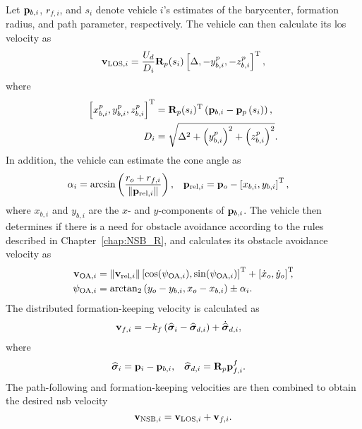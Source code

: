 Let $\mathbf{p}_{b, i}$, $r_{f, i}$, and $s_i$ denote vehicle $i$'s estimates of the barycenter, formation radius, and path parameter, respectively.
The vehicle can then calculate its \gls{los} velocity as
\begin{equation}
    \mathbf{v}_{{\rm LOS}, i} = \frac{U_d}{D_i} \mathbf{R}_p(s_i) \left[\Delta, -y_{b, i}^p, -z_{b, i}^p\right]^{\mathrm{T}},
\end{equation}
where
\begin{align}
    \left[x_{b, i}^p, y_{b, i}^p, z_{b, i}^p\right]^{\mathrm{T}} &= \mathbf{R}_p(s_i)^{\mathrm{T}} \left(\mathbf{p}_{b, i} - \mathbf{p}_p\left(s_i\right)\right), \\
    D_i &= \sqrt{\Delta^2 + \left(y_{b, i}^p\right)^2 + \left(z_{b, i}^p\right)^2}.
\end{align}
In addition, the vehicle can estimate the cone angle as
\begin{align}
    \alpha_i &= \arcsin\left(\frac{r_o + r_{f, i}}{\left\|\mathbf{p}_{{\rm rel}, i}\right\|}\right), &
    \mathbf{p}_{{\rm rel}, i} &= \mathbf{p}_o - \left[x_{b, i}, y_{b, i}\right]^{\mathrm{T}},
\end{align}
where $x_{b, i}$ and $y_{b, i}$ are the $x$- and $y$-components of $\mathbf{p}_{b, i}$.
The vehicle then determines if there is a need for obstacle avoidance according to the rules described in Chapter~\ref{chap:NSB_R}, and calculates its obstacle avoidance velocity as
\begin{align}
    \mathbf{v}_{{\rm OA}, i} &= \left\|\mathbf{v}_{{\rm rel}, i}\right\| \left[\cos(\psi_{{\rm OA}, i}), \sin(\psi_{{\rm OA}, i})\right]^{\mathrm{T}} + \left[\dot{x}_o, \dot{y}_o\right]^{\mathrm{T}}\!\!\!, \\
    \psi_{{\rm OA}, i} &= {\rm arctan}_2 \left(y_o - y_{b, i}, x_o - x_{b, i}\right) \pm \alpha_i.
\end{align}
The distributed formation-keeping velocity is calculated as
\begin{align}
    \mathbf{v}_{f, i} &= -k_f \left(\widehat{\bm{\sigma}}_i - \widehat{\bm{\sigma}}_{d,i}\right) + \dot{\widehat{\bm{\sigma}}}_{d,i},
    \label{eq:distr_NSB_v_f_distributed}
\end{align}
where
\begin{align}
    \widehat{\bm{\sigma}}_i &= \mathbf{p}_i - \mathbf{p}_{b, i}, &
    \widehat{\bm{\sigma}}_{d,i} &= \mathbf{R}_p \mathbf{p}_{f, i}^f.
\end{align}
The path-following and formation-keeping velocities are then combined to obtain the desired \gls{nsb} velocity
\begin{equation}
    \mathbf{v}_{{\rm NSB}, i} = \mathbf{v}_{{\rm LOS}, i} + \mathbf{v}_{f, i}.
\end{equation}

